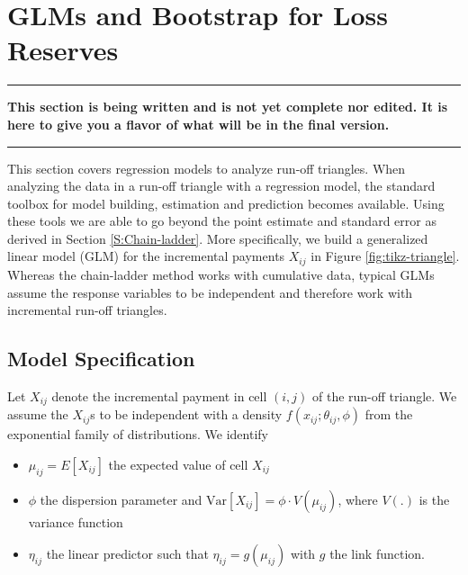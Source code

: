 \documentclass[]{book}
\providecommand{\tightlist}{%
  \setlength{\itemsep}{0pt}\setlength{\parskip}{0pt}}
\begin{document}
\section{GLMs and Bootstrap for Loss Reserves}\label{S:GLMs}

\begin{center}\rule{0.5\linewidth}{\linethickness}\end{center}

\textbf{This section is being written and is not yet complete nor
edited. It is here to give you a flavor of what will be in the final
version.}

\begin{center}\rule{0.5\linewidth}{\linethickness}\end{center}

This section covers regression models to analyze run-off triangles. When
analyzing the data in a run-off triangle with a regression model, the
standard toolbox for model building, estimation and prediction becomes
available. Using these tools we are able to go beyond the point estimate
and standard error as derived in Section \ref{S:Chain-ladder}. More
specifically, we build a generalized linear model (GLM) for the
incremental payments \(X_{ij}\) in Figure \ref{fig:tikz-triangle}.
Whereas the chain-ladder method works with cumulative data, typical GLMs
assume the response variables to be independent and therefore work with
incremental run-off triangles.

\subsection{Model Specification}\label{model-specification}

Let \(X_{ij}\) denote the incremental payment in cell \((i,j)\) of the
run-off triangle. We assume the \(X_{ij}\)s to be independent with a
density \(f(x_{ij};\theta_{ij},\phi)\) from the exponential family of
distributions. We identify

\begin{itemize}
\tightlist
\item
  \(\mu_{ij}=E[X_{ij}]\) the expected value of cell \(X_{ij}\)
\item
  \(\phi\) the dispersion parameter and
  \(\text{Var}[X_{ij}]=\phi \cdot V(\mu_{ij})\), where \(V(.)\) is the
  variance function
\item
  \(\eta_{ij}\) the linear predictor such that \(\eta_{ij}=g(\mu_{ij})\)
  with \(g\) the link function.
\end{itemize}
\end{document}
